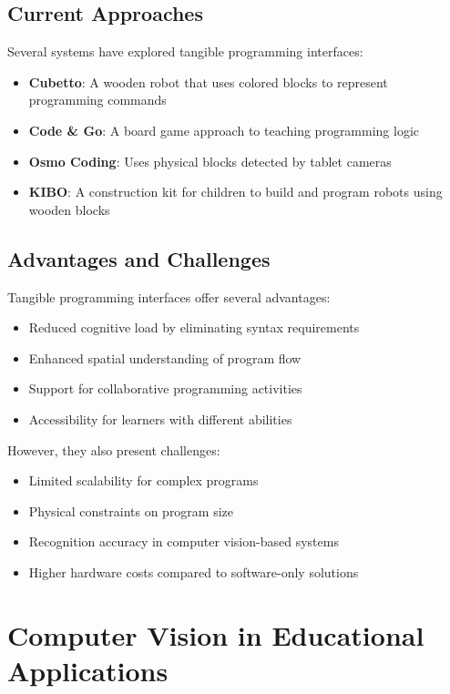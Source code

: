 \subsection{Current Approaches}

Several systems have explored tangible programming interfaces:

\begin{itemize}
    \item \textbf{Cubetto}: A wooden robot that uses colored blocks to represent programming commands
    \item \textbf{Code \& Go}: A board game approach to teaching programming logic
    \item \textbf{Osmo Coding}: Uses physical blocks detected by tablet cameras
    \item \textbf{KIBO}: A construction kit for children to build and program robots using wooden blocks
\end{itemize}

\subsection{Advantages and Challenges}

Tangible programming interfaces offer several advantages:
\begin{itemize}
    \item Reduced cognitive load by eliminating syntax requirements
    \item Enhanced spatial understanding of program flow
    \item Support for collaborative programming activities
    \item Accessibility for learners with different abilities
\end{itemize}

However, they also present challenges:
\begin{itemize}
    \item Limited scalability for complex programs
    \item Physical constraints on program size
    \item Recognition accuracy in computer vision-based systems
    \item Higher hardware costs compared to software-only solutions
\end{itemize}

\section{Computer Vision in Educational Applications}

